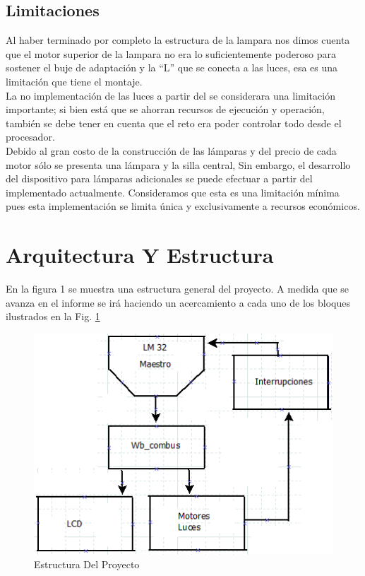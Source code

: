 \documentclass[twocolumn]{IEEEtran}
\begin{document}
\subsection{Limitaciones}
\noindent
Al haber terminado por completo la estructura de la lampara nos dimos cuenta que el motor superior de la lampara no era lo suficientemente poderoso para sostener el buje de adaptación y la ``L'' que se conecta a las luces, esa es una limitación que tiene el montaje.\\
La no implementación de las luces a partir del se considerara  una limitación importante; si bien está que se ahorran recursos de ejecución  y operación, también se debe tener en cuenta que el reto era poder controlar todo desde el procesador.\\
Debido al gran costo de la construcción de las lámparas y del precio de cada motor sólo se presenta una lámpara y la silla central, Sin embargo, el desarrollo del dispositivo para lámparas adicionales se puede efectuar a partir del implementado actualmente. Consideramos que esta es una limitación mínima pues esta implementación  se limita única y exclusivamente a recursos económicos.

\section{Arquitectura Y Estructura}
\noindent
En la figura 1 se muestra una estructura general del proyecto. A medida que se avanza en el informe se irá haciendo un acercamiento a cada uno de los bloques ilustrados en la Fig. \ref{fig1}
\begin{figure}[H]
	\centering
		\includegraphics[scale=0.5]{Structure.png}
	\caption{Estructura Del Proyecto}
	\label{fig1}
\end{figure}
\end{document}

